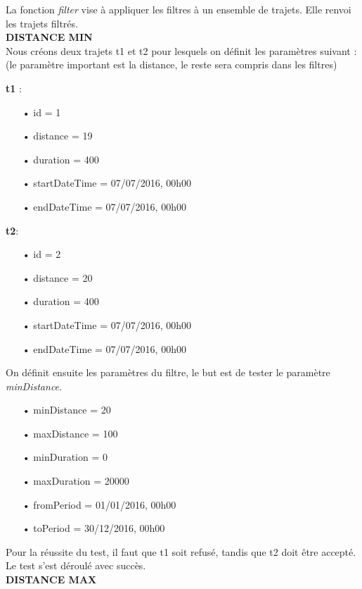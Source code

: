 \documentclass[12pt]{article}
\begin{document}
	La fonction \textit{filter} vise à appliquer les filtres à un ensemble de trajets. Elle renvoi les trajets filtrés.\\

	\textbf{DISTANCE MIN}\\
	Nous créons deux trajets t1 et t2 pour lesquels on définit les paramètres suivant : (le paramètre important est la distance, le reste sera compris dans les filtres)

	\textbf{t1} :\\
	\begin{itemize}
	\item[•] id = 1
	\item[•] distance = 19
	\item[•] duration = 400
	\item[•] startDateTime = 07/07/2016, 00h00
	\item[•] endDateTime = 07/07/2016, 00h00
	\end{itemize}
	
	\textbf{t2}:\\
	\begin{itemize}
	\item[•] id = 2
	\item[•] distance = 20
	\item[•] duration = 400
	\item[•] startDateTime = 07/07/2016, 00h00
	\item[•] endDateTime = 07/07/2016, 00h00	
	\end{itemize}
	
	On définit ensuite les paramètres du filtre, le but est de tester le paramètre \textit{minDistance}.
	\begin{itemize}
	\item[•] minDistance = 20
	\item[•] maxDistance = 100
	\item[•] minDuration = 0
	\item[•] maxDuration = 20000
	\item[•] fromPeriod = 01/01/2016, 00h00
	\item[•] toPeriod = 30/12/2016, 00h00
	\end{itemize}

	Pour la réussite du test, il faut que t1 soit refusé, tandis que t2 doit être accepté.\\

	Le test s’est déroulé avec succès.\\

	\textbf{DISTANCE MAX}\\
	
\end{document}
